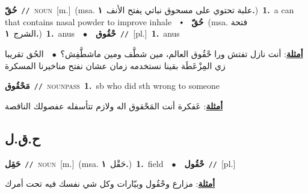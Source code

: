 \documentclass[10pt,a4paper,twoside]{article} %
\begin{document}
\begin{multicols}{2}
{\setlength\topsep{0pt}\textbf{\foreignlanguage{arabic}{حُقّ}}\ {\color{gray}\texttt{//}\color{black}}\ \textsc{noun}\ [m.]\ \color{gray}(msa. \foreignlanguage{arabic}{علبة تحتوي على مسحوق نباتي يفتح الأنف}~\foreignlanguage{arabic}{\textbf{١.}})\color{black}\ \textbf{1.}~a can that contains nasal powder to improve inhale\ \ $\smblkdiamond$\ \ \setlength\topsep{0pt}\textbf{\foreignlanguage{arabic}{حُقّ}}\ \color{gray}(msa. \foreignlanguage{arabic}{فتحة الشرج}~\foreignlanguage{arabic}{\textbf{١.}})\color{black}\ \textbf{1.}~anus\ \ $\bullet$\ \ \setlength\topsep{0pt}\textbf{\foreignlanguage{arabic}{حْقُوق}}\ {\color{gray}\texttt{//}\color{black}}\ [pl.]\ \textbf{1.}~anus\  \begin{flushright}\color{gray}\foreignlanguage{arabic}{\textbf{\underline{\foreignlanguage{arabic}{أمثلة}}}: أنت نازل تفتش ورا حْقُوق العالم، مين شطَّف ومين ماشطَّفِش؟\ $\bullet$\ \  الحُق تقريبا زي المِزْعَطَة بقينا نستخدمه زمان عشان نفتح مناخيرنا المسكرة}\end{flushright}\color{black}} \vspace{2mm}

{\setlength\topsep{0pt}\textbf{\foreignlanguage{arabic}{مَحْقُوق}}\ {\color{gray}\texttt{//}\color{black}}\ \textsc{noun\textunderscore pass}\ \textbf{1.}~sb who did sth wrong to someone\  \begin{flushright}\color{gray}\foreignlanguage{arabic}{\textbf{\underline{\foreignlanguage{arabic}{أمثلة}}}: عَفكرة أنت المَحْقوق اله ولازم تتأسفله عفصولك الناقصة}\end{flushright}\color{black}} \vspace{2mm}

\vspace{-3mm}
\subsection*{\color{blue}\foreignlanguage{arabic}{ح.ق.ل}\color{blue}{}} 

{\setlength\topsep{0pt}\textbf{\foreignlanguage{arabic}{حَقِل}}\ {\color{gray}\texttt{//}\color{black}}\ \textsc{noun}\ [m.]\ \color{gray}(msa. \foreignlanguage{arabic}{حَقْل}~\foreignlanguage{arabic}{\textbf{١.}})\color{black}\ \textbf{1.}~field\ \ $\bullet$\ \ \setlength\topsep{0pt}\textbf{\foreignlanguage{arabic}{حْقُول}}\ {\color{gray}\texttt{//}\color{black}}\ [pl.]\  \begin{flushright}\color{gray}\foreignlanguage{arabic}{\textbf{\underline{\foreignlanguage{arabic}{أمثلة}}}: مزارع وحْقُول وبيّارات وكل شي نفسك فيه تحت أمرك}\end{flushright}\color{black}} \vspace{2mm}


\end{multicols}
\end{document}
